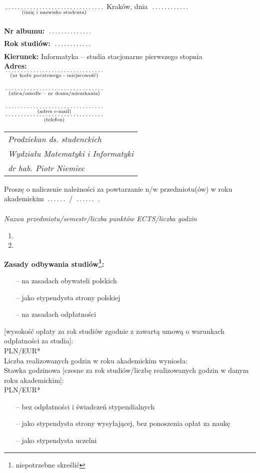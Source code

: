 \documentclass[a4paper,11pt]{article}
\newcommand{\fillField}[2]{
    $\underset{\text{#1}}{\parbox[t]{#2}{\dotfill}}$
}
\begin{document}
\noindent
\fillField{(imię i nazwisko studenta)}{5cm} \hfill Kraków, dnia \fillField{}{2cm} \\\\
\textbf{Nr albumu:}   \fillField{}{2.3cm}\\
\textbf{Rok studiów:} \fillField{}{2cm}\\
\textbf{Kierunek:} Informatyka -- studia stacjonarne pierwszego stopnia\\
\textbf{Adres:}\\
\fillField{(nr kodu pocztowego - miejscowość)}{5cm}\\\\
\fillField{(ulica/osiedle – nr domu/mieszkania)}{5cm}\\\\
\fillField{(adres e-mail)}{5cm}\\
\fillField{(telefon)}{5cm}
\phantom{a}\hfill
\begin{tabular}[c]{@{}l@{}}
\textit{Prodziekan ds. studenckich} \\
\textit{Wydziału Matematyki i Informatyki}\\
\textit{dr hab. Piotr Niemiec}
\end{tabular}

\vskip 1.0cm

\noindent
Proszę o naliczenie należności za powtarzanie n/w przedmiotu(ów) w roku\\ akademickim \fillField{}{1cm}/\fillField{}{1cm}.

\noindent
\textit{Nazwa przedmiotu/semestr/liczba punktów ECTS/liczba godzin}
\begin{enumerate}
    \item \dotfill
    \item \dotfill
\end{enumerate}{\footnotesize
\textbf{Zasady odbywania studiów\footnote[1]{niepotrzebne skreślić}:}
\begin{itemize}
    \itemsep-0.7em
    \item[--] na zasadach obywateli polskich
    \item[--] jako stypendysta strony polskiej
    \item[--] na zasadach odpłatności
\end{itemize}
[wysokość opłaty za rok studiów zgodnie z zawartą umową o warunkach odpłatności za studia]: \dotfill\\ PLN/EUR*\\
Liczba realizowanych godzin w roku akademickim \dotfill wyniosła: \dotfill\\
Stawka godzinowa [czesne za rok studiów/liczbę realizowanych godzin w danym roku akademickim]: \dotfill\\ PLN/EUR*
\begin{itemize}
    \itemsep-0.7em
    \item[--] bez odpłatności i świadczeń stypendialnych
    \item[--] jako stypendysta strony wysyłającej, bez ponoszenia opłat za naukę
    \item[--] jako stypendysta uczelni
\end{itemize}
}
\end{document}
